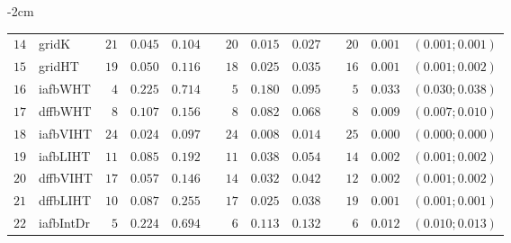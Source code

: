 \begin{table*}[!htbp]
\begin{adjustwidth*}{}{-2cm}
\begin{tabular}{@{}rlrrrrrrrrrcc@{}}
\footnotesize{$14$} & \footnotesize{gridK    } & \footnotesize{$21$} & \footnotesize{$0.045$} & \footnotesize{$0.104$} && \footnotesize{$20$} & \footnotesize{$0.015$} & \footnotesize{$0.027$} && \footnotesize{$20$} & \footnotesize{$0.001$} & \footnotesize{$(0.001;0.001)$} \\
\footnotesize{$15$} & \footnotesize{gridHT   } & \footnotesize{$19$} & \footnotesize{$0.050$} & \footnotesize{$0.116$} && \footnotesize{$18$} & \footnotesize{$0.025$} & \footnotesize{$0.035$} && \footnotesize{$16$} & \footnotesize{$0.001$} & \footnotesize{$(0.001;0.002)$} \\
\footnotesize{$16$} & \footnotesize{iafbWHT  } & \footnotesize{$4 $} & \footnotesize{$0.225$} & \footnotesize{$0.714$} && \footnotesize{$5 $} & \footnotesize{$0.180$} & \footnotesize{$0.095$} && \footnotesize{$5 $} & \footnotesize{$0.033$} & \footnotesize{$(0.030;0.038)$} \\
\footnotesize{$17$} & \footnotesize{dffbWHT  } & \footnotesize{$8 $} & \footnotesize{$0.107$} & \footnotesize{$0.156$} && \footnotesize{$8 $} & \footnotesize{$0.082$} & \footnotesize{$0.068$} && \footnotesize{$8 $} & \footnotesize{$0.009$} & \footnotesize{$(0.007;0.010)$} \\
\footnotesize{$18$} & \footnotesize{iafbVIHT } & \footnotesize{$24$} & \footnotesize{$0.024$} & \footnotesize{$0.097$} && \footnotesize{$24$} & \footnotesize{$0.008$} & \footnotesize{$0.014$} && \footnotesize{$25$} & \footnotesize{$0.000$} & \footnotesize{$(0.000;0.000)$} \\
\footnotesize{$19$} & \footnotesize{iafbLIHT } & \footnotesize{$11$} & \footnotesize{$0.085$} & \footnotesize{$0.192$} && \footnotesize{$11$} & \footnotesize{$0.038$} & \footnotesize{$0.054$} && \footnotesize{$14$} & \footnotesize{$0.002$} & \footnotesize{$(0.001;0.002)$} \\
\footnotesize{$20$} & \footnotesize{dffbVIHT } & \footnotesize{$17$} & \footnotesize{$0.057$} & \footnotesize{$0.146$} && \footnotesize{$14$} & \footnotesize{$0.032$} & \footnotesize{$0.042$} && \footnotesize{$12$} & \footnotesize{$0.002$} & \footnotesize{$(0.001;0.002)$} \\
\footnotesize{$21$} & \footnotesize{dffbLIHT } & \footnotesize{$10$} & \footnotesize{$0.087$} & \footnotesize{$0.255$} && \footnotesize{$17$} & \footnotesize{$0.025$} & \footnotesize{$0.038$} && \footnotesize{$19$} & \footnotesize{$0.001$} & \footnotesize{$(0.001;0.001)$} \\
\footnotesize{$22$} & \footnotesize{iafbIntDr} & \footnotesize{$5 $} & \footnotesize{$0.224$} & \footnotesize{$0.694$} && \footnotesize{$6 $} & \footnotesize{$0.113$} & \footnotesize{$0.132$} && \footnotesize{$6 $} & \footnotesize{$0.012$} & \footnotesize{$(0.010;0.013)$} \\

\end{tabular}
\end{adjustwidth*}
\end{table*}
